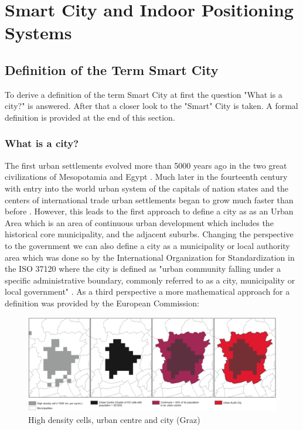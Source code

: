 \section{Smart City and Indoor Positioning Systems} %

\subsection{Definition of the Term Smart City} 
To derive a definition of the term Smart City at first the question "What is a city?" is answered. After that a closer look to the "Smart" City is taken. A formal definition is provided at the end of this section.
 
\subsubsection{What is a city?}
The first urban settlements evolved more than 5000 years ago in the two great civilizations of Mesopotamia and Egypt \parencite{berUrban}. Much later in the fourteenth century with entry into the world urban system of the capitals of nation states and the centers of international trade urban settlements began to grow much faster than before \parencite{urbanTrends}. However, this leads to the first approach to define a city as as an Urban Area which is an area of continuous urban development which includes the historical core municipality, and the adjacent suburbs. 
Changing the perspective to the government we can also define a city as a municipality or local authority area which was done so by the International Organization for Standardization in the ISO 37120 where the city is defined as "urban community falling under a specific administrative boundary, commonly referred to as a city, municipality or local government" \parencite{ISO37120}. %
As a third perspective a more mathematical approach for a definition was provided by the European Commission:

\begin{figure}[h]
	\centering
		\includegraphics[width=.9\textwidth]{images/graz.png}
	\caption{High density cells, urban centre and city (Graz) \parencite{euDef}}
	\label{fig:images_graz}
\end{figure}

